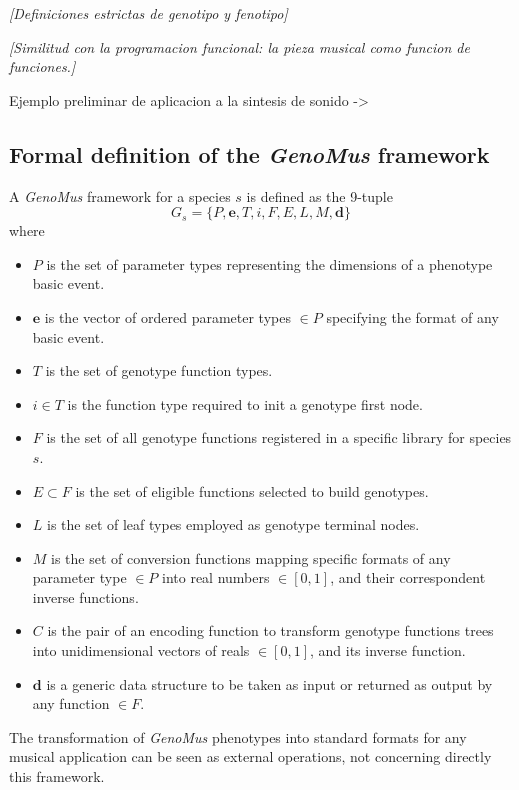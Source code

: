 \documentclass{article}
\renewcommand{\vec}[1]{\mathbf{#1}}
\begin{document}
{\color{gray} \textsl{[Definiciones estrictas de genotipo y fenotipo]}}


{\color{gray} \textsl{[Similitud con la programacion funcional: la pieza musical como funcion de funciones.]}}



{\color{red}

Ejemplo preliminar de aplicacion a la sintesis de sonido -> \cite{microcontrapunctus}
}



\subsection{Formal definition of the \textsl{GenoMus} framework}

A \textsl{GenoMus} framework for a species $s$ is defined as the 9-tuple $$G_s = \{P, \vec{e}, T, i, F, E, L, M, \vec{d}\}$$ where

\begin{itemize}
\item $P$ is the set of parameter types representing the dimensions of a phenotype basic event.
\item $\vec{e}$ is the vector of ordered parameter types $\in P$ specifying the format of any basic event. 
\item $T$ is the set of genotype function types. 
\item $i \in T$ is the function type required to init a genotype first node.
\item $F$ is the set of all genotype functions registered in a specific library for species $s$.
\item $E \subset F$ is the set of eligible functions selected to build genotypes.
\item $L$ is the set of leaf types employed as genotype terminal nodes.
\item $M$ is the set of conversion functions mapping specific formats of any parameter type $\in P$ into real numbers $\in [0,1]$, and their correspondent inverse functions.
\item $C$ is the pair of an encoding function to transform genotype functions trees into unidimensional vectors of reals $\in [0,1]$, and its inverse function.
\item $\vec{d}$ is a generic data structure to be taken as input or returned as output by any function $\in F$.
\end{itemize}

The transformation of \textsl{GenoMus} phenotypes into standard formats for any musical application can be seen as external operations, not concerning directly this framework. 
\end{document}
